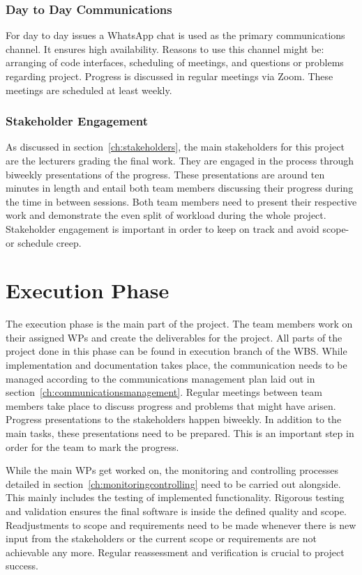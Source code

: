 \subsubsection{Day to Day Communications}
\label{ch:daytodaycomms}
For day to day issues a WhatsApp chat is used as the primary communications channel. It ensures high availability. Reasons to use this channel might be: arranging of code interfaces, scheduling of meetings, and questions or problems regarding project. Progress is discussed in regular meetings via Zoom. These meetings are scheduled at least weekly.


\subsubsection{Stakeholder Engagement}
\label{ch:stakeholerengagement}
As discussed in section~\ref{ch:stakeholders}, the main stakeholders for this project are the lecturers grading the final work. They are engaged in the process through biweekly presentations of the progress. These presentations are around ten minutes in length and entail both team members discussing their progress during the time in between sessions. Both team members need to present their respective work and demonstrate the even split of workload during the whole project. Stakeholder engagement is important in order to keep on track and avoid scope- or schedule creep.


\section{Execution Phase}
\label{ch:executionphase}
The execution phase is the main part of the project. The team members work on their assigned \ac{WP}s and create the deliverables for the project. All parts of the project done in this phase can be found in execution branch of the \ac{WBS}. While implementation and documentation takes place, the communication needs to be managed according to the communications management plan laid out in section~\ref{ch:communicationsmanagement}. Regular meetings between team members take place to discuss progress and problems that might have arisen. Progress presentations to the stakeholders happen biweekly. In addition to the main tasks, these presentations need to be prepared. This is an important step in order for the team to mark the progress.

While the main \ac{WP}s get worked on, the monitoring and controlling processes detailed in section~\ref{ch:monitoringcontrolling} need to be carried out alongside. This mainly includes the testing of implemented functionality. Rigorous testing and validation ensures the final software is inside the defined quality and scope. Readjustments to scope and requirements need to be made whenever there is new input from the stakeholders or the current scope or requirements are not achievable any more. Regular reassessment and verification is crucial to project success.



